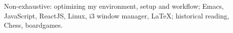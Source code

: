 \documentclass[10pt,a4paper]{article} %
\begin{document}
\spacedhrule{1.6em}{-0.4em} %



\inlineheadsection %
{Non-exhaustive:}
{optimizing my environment, setup and workflow; Emacs, JavaScript, ReactJS, Linux, i3 window manager, \LaTeX; historical reading, Chess, boardgames.}

\end{document}
